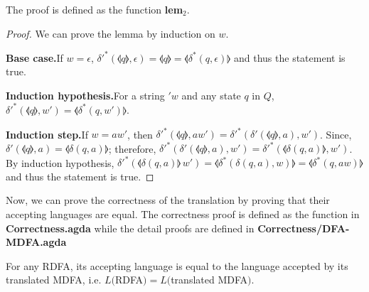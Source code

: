 \par The proof is defined as the function \textbf{lem\(_2\)}. 

\begin{proof}
\noindent We can prove the lemma by induction on \(w\). 

\par \noindent \textbf{Base case.}\quad If \(w = \epsilon\),
\(\delta'^*(\llangle q \rrangle,\epsilon) = \llangle q \rrangle =
\llangle \delta^*(q,\epsilon) \rrangle\) and thus the statement is
true. 

\par \noindent \textbf{Induction hypothesis.}\quad For a string \('w\) and
any state \(q\) in \(Q\), \(\delta'^*(\llangle q \rrangle,w') = \llangle \delta^*(q,w') \rrangle\). 

\par \noindent \textbf{Induction step.}\quad If \(w = aw'\), then
\(\delta'^*(\llangle q \rrangle,aw') = \delta'^*(\delta'(\llangle q
\rrangle,a),w')\). Since, \(\delta'(\llangle q \rrangle,a) = \llangle
\delta(q,a) \rrangle\); therefore, \(\delta'^*(\delta'(\llangle q
\rrangle,a),w') = \delta'^*(\llangle
\delta(q,a) \rrangle,w')\). By induction hypothesis,
\(\delta'^*(\llangle \delta(q,a) \rrangle\,w') = \llangle
\delta^*(\delta(q,a),w) \rrangle = \llangle
\delta^*(q,aw) \rrangle\) and thus the statement is true. 
\end{proof}

\par Now, we can prove the correctness of the translation by proving
that their accepting languages are equal. The correctness proof is
defined as the function  in
\textbf{Correctness.agda} while the detail proofs are defined in \textbf{Correctness/DFA-MDFA.agda}

\begin{thm}
\noindent For any RDFA, its accepting language is equal to
the language accepted by its translated MDFA, i.e. \(L(\)RDFA\()
= L(\)translated MDFA\()\). 
\end{thm}

